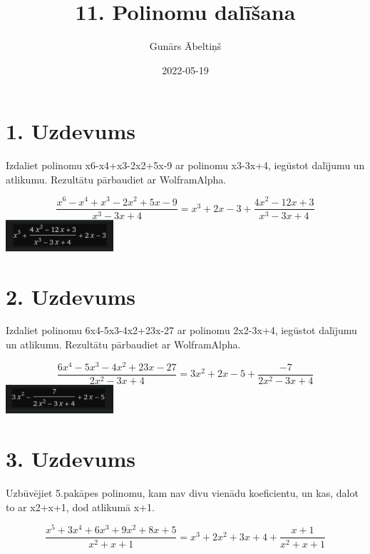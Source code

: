 \documentclass{article}
\title{11. Polinomu dalīšana}
\author{Gunārs Ābeltiņš}
\date{2022-05-19}
\begin{document}
\maketitle

\section*{1. Uzdevums}
Izdaliet polinomu x6-x4+x3-2x2+5x-9 ar polinomu x3-3x+4, iegūstot dalījumu un atlikumu. Rezultātu pārbaudiet ar WolframAlpha.

\begin{equation*}
    \frac{x^6-x^4+x^3-2x^2+5x-9}{x^3-3x+4} = x^3 + 2x - 3 + \frac{4x^2-12x+3}{x^3-3x+4}
\end{equation*}
\includegraphics[width=0.3\textwidth, center]{1}

\section*{2. Uzdevums}
Izdaliet polinomu 6x4-5x3-4x2+23x-27 ar polinomu 2x2-3x+4, iegūstot dalījumu un atlikumu. Rezultātu pārbaudiet ar WolframAlpha.

\begin{equation*}
    \frac{6x^4-5x^3-4x^2+23x-27}{2x^2-3x+4} = 3x^2 + 2x - 5 + \frac{-7}{2x^2-3x+4}
\end{equation*}
\includegraphics[width=0.3\textwidth, center]{2}

\section*{3. Uzdevums}
Uzbūvējiet 5.pakāpes polinomu, kam nav divu vienādu koeficientu, un kas, dalot to ar x2+x+1, dod atlikumā x+1.

\begin{equation*}
    \frac{x^5+3x^4+6x^3+9x^2+8x+5}{x^2+x+1} = x^3 + 2x^2 + 3x + 4 + \frac{x+1}{x^2+x+1}
\end{equation*}
\end{document}
